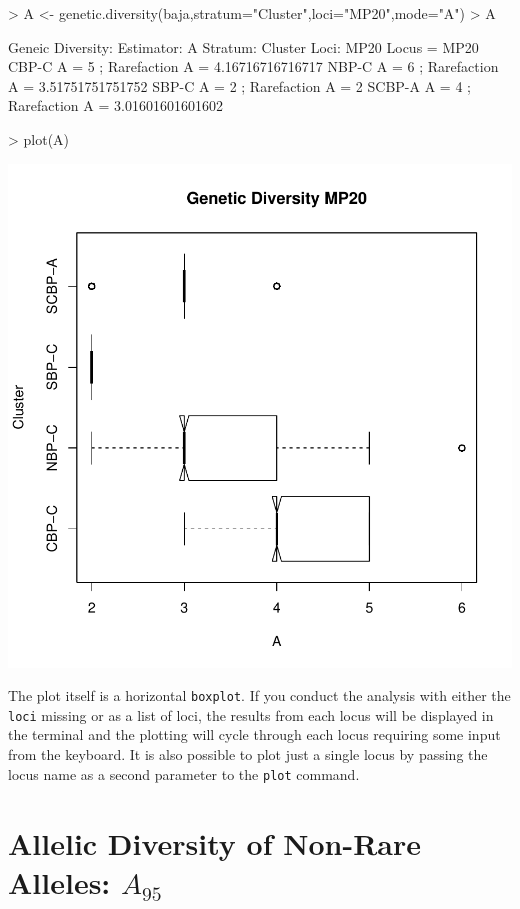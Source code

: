 \documentclass[letterpaper,twoside,openany]{book}
\begin{document}
\begin{Schunk}
\begin{Sinput}
> A <- genetic.diversity(baja,stratum="Cluster",loci="MP20",mode="A")
> A
\end{Sinput}
\begin{Soutput}
Geneic Diversity:
  Estimator: A 
  Stratum: Cluster 
  Loci: { MP20 }
  Locus = MP20 
    CBP-C A = 5 ; Rarefaction A = 4.16716716716717 
    NBP-C A = 6 ; Rarefaction A = 3.51751751751752 
    SBP-C A = 2 ; Rarefaction A = 2 
    SCBP-A A = 4 ; Rarefaction A = 3.01601601601602 
\end{Soutput}
\begin{Sinput}
> plot(A)
\end{Sinput}
\end{Schunk}
\includegraphics{gstudio-023}

The plot itself is a horizontal \texttt{boxplot}.  If you conduct the analysis with either the \texttt{loci} missing or as a list of loci, the results from each locus will be displayed in the terminal and the plotting will cycle through each locus requiring some input from the keyboard.  It is also possible to plot just a single locus by passing the locus name as a second parameter to the \texttt{plot} command.

\section{Allelic Diversity of Non-Rare Alleles: $A_{95}$}
\end{document}
